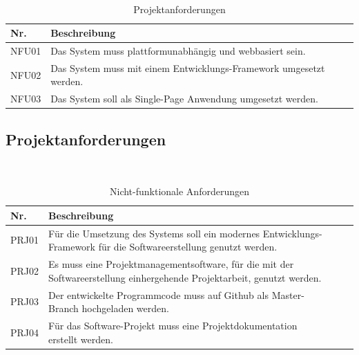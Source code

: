 \documentclass[a4paper, 11pt]{scrreprt}
\begin{document}
\begin{table}[h]

\caption{Projektanforderungen}

\ \\

\par

\label{tab:Tabelle1}

\centering

\begin{tabular}{|p{2.5cm} p{12cm}| ll}

\hline
Nr.	& Beschreibung\\

\hline
NFU01 &	Das System muss plattformunabhängig und webbasiert sein. \\

\hline
NFU02 &	Das System muss mit einem Entwicklungs-Framework umgesetzt werden.\\

\hline
NFU03 &	Das System soll als Single-Page Anwendung umgesetzt werden.\\

\hline

\end{tabular}

\end{table}

\subsection{Projektanforderungen}

\begin{table}[h]

\caption{Nicht-funktionale Anforderungen}

\ \\

\par

\label{tab:Tabelle1}

\centering

\begin{tabular}{|p{2.5cm} p{12cm}| ll}

\hline
Nr. &	Beschreibung\\

\hline
PRJ01 &	Für die Umsetzung des Systems soll ein modernes Entwicklungs-Framework für die Softwareerstellung genutzt werden.\\
PRJ02 &	Es muss eine Projektmanagementsoftware, für die mit der Softwareerstellung einhergehende Projektarbeit, genutzt werden.\\

\hline
PRJ03 &	Der entwickelte Programmcode muss auf Github als Master-Branch hochgeladen werden.\\

\hline
PRJ04 &	Für das Software-Projekt muss eine Projektdokumentation erstellt werden.\\

\hline
\end{tabular}

\end{table}
\end{document}

